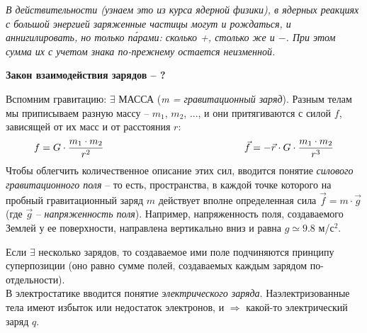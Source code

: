 \documentclass[12pt,epsfig,color,russian]{article}
\begin{document}
{\em В действительности (узнаем это из курса ядерной физики), в ядерных реакциях с большой энергией заряженные частицы могут и рождаться, и аннигилировать, но только п\'{а}рами: сколько +, столько же и $-$. При этом сумма их с учетом знака по-прежнему остается неизменной.}


\centerline{\bf Закон взаимодействия зарядов -- ?}
Вспомним гравитацию:  $\exists$ МАССА ({\em m =  гравитационный заряд}). Разным телам мы приписываем разную массу -- $m_1$, $m_2$, ..., и они при\-тя\-ги\-ва\-ют\-ся с силой $f$, зависящей от их масс и от расстояния $r$:
\begin{displaymath}
 f=G\cdot\frac{m_1\cdot m_2}{r^2}\hspace{50mm}\vec{f}=-\vec{r}\cdot G\cdot\frac{m_1\cdot m_2}{r^3}
\end{displaymath}
Чтобы облегчить количественное описание этих сил, вводится понятие {\em сило\-вого гравитационного поля} -- то есть, пространства, в каждой точке которого на пробный гравитационный заряд $m$ действует вполне определен\-ная сила $\vec{f}=m\cdot \vec{g}$ (где $\vec{g}$ -- {\em напряженность поля}). Например, напряженность поля, создаваемого Землей у ее поверхности, направлена вертикально вниз и равна $g\simeq9.8$ м/с$^2$.

Если $\exists$ несколько зарядов,  то создаваемое ими поле подчиняются прин\-ци\-пу суперпозиции (оно равно сумме полей, создаваемых каждым зарядом по-отдельности).\\[5mm]

В электростатике вводится понятие {\em электрического заряда}. Наэлек\-три\-зо\-ванные тела имеют избыток или недостаток электронов, и $\Rightarrow$ какой-то электрический заряд $q$.
\end{document}
